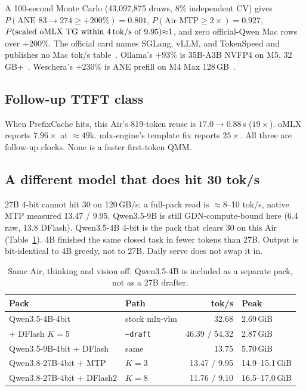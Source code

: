 A 100-second Monte Carlo (43,097,875 draws, 8\% independent CV) gives $P(\text{ANE }83{\to}274 \ge {+}200\%){=}0.801$, $P(\text{Air MTP} \ge 2\times){=}0.927$, $P(\text{scaled oMLX TG within }4\,\mathrm{tok/s}\text{ of }9.95){\approx}1$, and zero official-Qwen Mac rows over ${+}200\%$. The official card names SGLang, vLLM, and TokenSpeed and publishes no Mac tok/s table~\citep{qwen38card}. Ollama's ${+}93\%$ is 35B-A3B NVFP4 on M5, 32\,GB+~\citep{ollama019}. Weschera's ${+}230\%$ is ANE prefill on M4 Max 128\,GB~\citep{weschera2026}.

\subsection{Follow-up TTFT class}

When PrefixCache hits, this Air's 819-token reuse is $17.0 \to 0.88$\,s ($19\times$). oMLX reports $7.96\times$ at $\approx 49$k. mlx-engine's template fix reports $25\times$. All three are follow-up clocks. None is a faster first-token QMM.

\subsection{A different model that does hit 30 tok/s}

27B 4-bit cannot hit 30 on 120\,GB/s: a full-pack read is $\approx 8$--10 tok/s, native MTP measured 13.47 / 9.95. Qwen3.5-9B is still GDN-compute-bound here (6.4 raw, 13.8 DFlash). Qwen3.5-4B 4-bit is the pack that clears 30 on this Air (Table~\ref{tab:4b}). 4B finished the same closed task in fewer tokens than 27B. Output is bit-identical to 4B greedy, not to 27B. Daily serve does not swap it in.

\begin{table}[ht]
\centering
\caption{Same Air, thinking and vision off. Qwen3.5-4B is included as a separate pack, not as a 27B drafter.}
\label{tab:4b}
\begin{tabular}{@{}llrl@{}}
\toprule
Pack & Path & tok/s & Peak \\
\midrule
Qwen3.5-4B-4bit & stock mlx-vlm & 32.68 & 2.69\,GiB \\
+ DFlash $K{=}5$ & \texttt{--draft} & 46.39 / 54.32 & 2.87\,GiB \\
Qwen3.5-9B-4bit + DFlash & same & 13.75 & 5.70\,GiB \\
Qwen3.8-27B-4bit + MTP & $K{=}3$ & 13.47 / 9.95 & 14.9--15.1\,GiB \\
Qwen3.8-27B-4bit + DFlash2 & $K{=}8$ & 11.76 / 9.10 & 16.5--17.0\,GiB \\
\bottomrule
\end{tabular}
\end{table}

